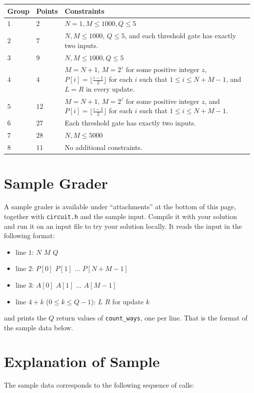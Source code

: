 \noindent
\begin{tabular}{| l | l | p{12cm} |}
  \hline
  \textbf{Group} & \textbf{Points} & \textbf{Constraints} \\ \hline
  $1$ & $2$  & $N = 1, M \leq 1000, Q \leq 5$ \\ \hline
  $2$ & $7$  & $N, M \leq 1000$, $Q \leq 5$, and each threshold gate has exactly two inputs. \\ \hline
  $3$ & $9$  & $N, M \leq 1000, Q \leq 5$ \\ \hline
  $4$ & $4$  & $M = N + 1$, $M = 2^z$ for some positive integer $z$,
               $P[i] = \lfloor \frac{i-1}{2} \rfloor$ for each $i$ such that
               $1 \leq i \leq N + M - 1$, and $L = R$ in every update. \\ \hline
  $5$ & $12$ & $M = N + 1$, $M = 2^z$ for some positive integer $z$, and
               $P[i] = \lfloor \frac{i-1}{2} \rfloor$ for each $i$ such that
               $1 \leq i \leq N + M - 1$. \\ \hline
  $6$ & $27$ & Each threshold gate has exactly two inputs. \\ \hline
  $7$ & $28$ & $N, M \leq 5000$ \\ \hline
  $8$ & $11$ & No additional constraints. \\ \hline
\end{tabular}

\section*{Sample Grader}
A sample grader is available under ``attachments'' at the bottom of this page, together with
\texttt{circuit.h} and the sample input. Compile it with your solution and run it on an input file to
try your solution locally. It reads the input in the following format:
\begin{itemize}
  \item line $1$: $N$ $M$ $Q$
  \item line $2$: $P[0]$ $P[1]$ $\ldots$ $P[N + M - 1]$
  \item line $3$: $A[0]$ $A[1]$ $\ldots$ $A[M-1]$
  \item line $4 + k$ ($0 \leq k \leq Q-1$): $L$ $R$ for update $k$
\end{itemize}
and prints the $Q$ return values of \texttt{count\_ways}, one per line. That is the format of the
sample data below.

\section*{Explanation of Sample}
The sample data corresponds to the following sequence of calls:

